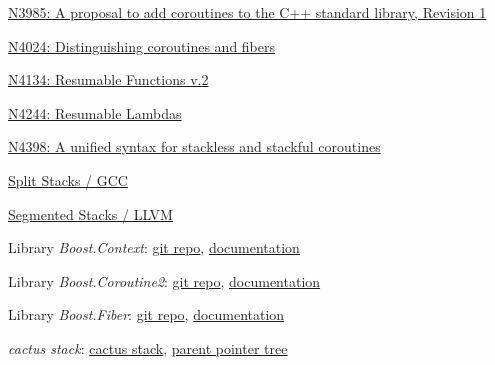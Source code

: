 \begin{thebibliography}{99}

        \href{http://www.open-std.org/jtc1/sc22/wg21/docs/papers/2014/n3985.pdf}
        {N3985: A proposal to add coroutines to the C++ standard library, Revision 1}

        \href{http://www.open-std.org/jtc1/sc22/wg21/docs/papers/2014/n4024.pdf}
        {N4024: Distinguishing coroutines and fibers}

        \href{http://www.open-std.org/jtc1/sc22/wg21/docs/papers/2014/n4134.pdf}
        {N4134: Resumable Functions v.2}

        \href{http://www.open-std.org/jtc1/sc22/wg21/docs/papers/2014/n4244.pdf}
        {N4244: Resumable Lambdas}

        \href{http://www.open-std.org/jtc1/sc22/wg21/docs/papers/2015/n4398.pdf}
        {N4398: A unified syntax for stackless and stackful coroutines}

        \href{http://gcc.gnu.org/wiki/SplitStacks}
        {Split Stacks / GCC}

        \href{http://llvm.org/releases/3.0/docs/SegmentedStacks.html}
        {Segmented Stacks / LLVM}

        Library \emph{Boost.Context}:
        \href{https://github.com/boostorg/context} {git repo},
        \href{http://www.boost.org/doc/libs/1_58_0/libs/context/doc/html/index.html} {documentation}

        Library \emph{Boost.Coroutine2}:
        \href{https://github.com/boostorg/coroutine2} {git repo},
        \href{http://olk.github.io/libs/coroutine2/doc/html/index.html} {documentation}

        Library \emph{Boost.Fiber}:
        \href{https://github.com/olk/boost-fiber} {git repo},
        \href{http://olk.github.io/libs/fiber/doc/html/index.html} {documentation}

        \emph{cactus stack}:
        \href{http://c2.com/cgi/wiki?CactusStack} {cactus stack},
        \href{http://en.wikipedia.org/wiki/Parent_pointer_tree} {parent pointer tree}

\end{thebibliography}
